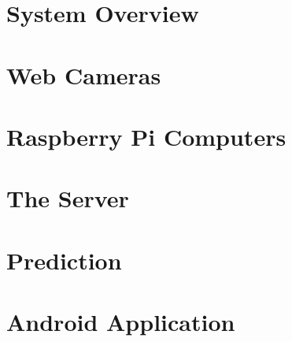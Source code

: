 \section{System Overview}


\section{Web Cameras}


\section{Raspberry Pi Computers}


\section{The Server}
\label{sec:design_server}


\section{Prediction}


\section{Android Application}
